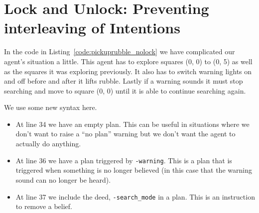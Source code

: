 \documentclass[a4]{article}
\begin{document}
\section{Lock and Unlock: Preventing interleaving of Intentions}
In the code in Listing~\ref{code:pickuprubble_nolock} we have complicated our agent's situation a little.  This agent has to explore squares (0, 0) to (0, 5) as well as the squares it was exploring previously.  It also has to switch warning lights on and off before and after it lifts rubble.  Lastly if a warning sounds it must stop searching and move to square (0, 0) until it is able to continue searching again.

We use some new syntax here.  
\begin{itemize}
\item At line 34 we have an empty plan.  This can be useful in situations where we don't want to raise a ``no plan'' warning but we don't want the agent to actually do anything.
\item At line 36 we have a plan triggered by \lstinline{-warning}.  This is a plan that is triggered when something is no longer believed (in this case that the warning sound can no longer be heard).
\item At line 37 we include the deed, \lstinline{-search_mode} in a plan.  This is an instruction to remove a belief.
\end{itemize}
\end{document}
